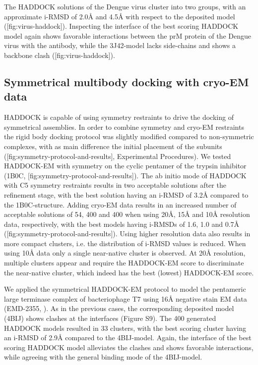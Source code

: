 The HADDOCK solutions of the Dengue virus cluster into two groups, with an approximate i-RMSD of 2.0Å and 4.5Å with respect to the deposited model ([fig:virus-haddock]). 
Inspecting the interface of the best scoring HADDOCK model again shows favorable interactions between the prM protein of the Dengue virus with the antibody, while the 3J42-model lacks side-chains and shows a backbone clash ([fig:virus-haddock]). 

\subsection{Symmetrical multibody docking with cryo-EM data}

{}

HADDOCK is capable of using symmetry restraints to drive the docking of symmetrical assemblies. 
In order to combine symmetry and cryo-EM restraints the rigid body docking protocol was slightly modified compared to non-symmetric complexes, with as main difference the initial placement of the subunits ([fig:symmetry-protocol-and-results], Experimental Procedures). 
We tested HADDOCK-EM with symmetry on the cyclic pentamer of the trypsin inhibitor (1B0C, [fig:symmetry-protocol-and-results]). 
The ab initio mode of HADDOCK with C5 symmetry restraints results in two acceptable solutions after the refinement stage, with the best solution having an i-RMSD of 3.2Å compared to the 1B0C-structure. 
Adding cryo-EM data results in an increased number of acceptable solutions of 54, 400 and 400 when using 20Å, 15Å and 10Å resolution data, respectively, with the best models having i-RMSDs of 1.6, 1.0 and 0.7Å ([fig:symmetry-protocol-and-results]). 
Using higher resolution data also results in more compact clusters, i.e. the distribution of i-RMSD values is reduced. 
When using 10Å data only a single near-native cluster is observed. At 20Å resolution, multiple clusters appear and require the HADDOCK-EM score to discriminate the near-native cluster, which indeed has the best (lowest) HADDOCK-EM score. 

We applied the symmetrical HADDOCK-EM protocol to model the pentameric large terminase complex of bacteriophage T7 using 16Å negative stain EM data (EMD-2355, \inlinecite[Dauden2013]).
As in the previous cases, the corresponding deposited model (4BIJ) shows clashes at the interfaces (Figure S9). 
The 400 generated HADDOCK models resulted in 33 clusters, with the best scoring cluster having an i-RMSD of 2.9Å compared to the 4BIJ-model. 
Again, the interface of the best scoring HADDOCK model alleviates the clashes and shows favorable interactions, while agreeing with the general binding mode of the 4BIJ-model.
